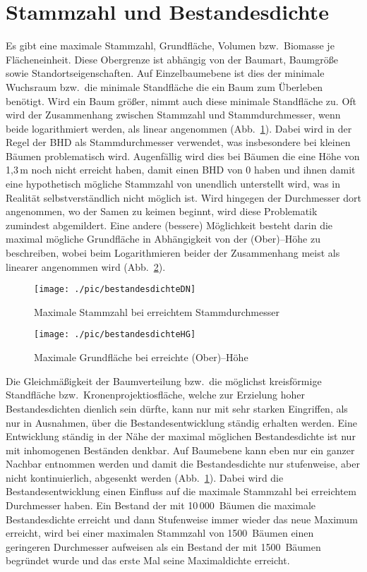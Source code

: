 \documentclass[twocolumn]{scrartcl}
\begin{document}
\section{Stammzahl und Bestandesdichte}
\label{sec:StammzahlUndBestandesdichte}

Es gibt eine maximale Stammzahl, Grundfläche, Volumen bzw.\ Biomasse je
Flächeneinheit. Diese Obergrenze ist abhängig von der Baumart, Baumgröße sowie
Standortseigenschaften. Auf Einzelbaumebene ist dies der minimale Wuchsraum
bzw.\ die minimale Standfläche die ein Baum zum Überleben benötigt. Wird ein
Baum größer, nimmt auch diese minimale Standfläche zu. Oft wird der Zusammenhang
zwischen Stammzahl und Stammdurchmesser, wenn beide logarithmiert werden, als
linear angenommen (Abb.~\ref{fig:bestandesdichteDN}). Dabei wird in der Regel
der BHD als Stammdurchmesser verwendet, was insbesondere bei kleinen Bäumen
problematisch wird. Augenfällig wird dies bei Bäumen die eine Höhe von 1,3\,m
noch nicht erreicht haben, damit einen BHD von 0 haben und ihnen damit eine
hypothetisch mögliche Stammzahl von unendlich unterstellt wird, was in Realität
selbstverständlich nicht möglich ist. Wird hingegen der Durchmesser dort
angenommen, wo der Samen zu keimen beginnt, wird diese Problematik zumindest
abgemildert. Eine andere (bessere) Möglichkeit besteht darin die maximal
mögliche Grundfläche in Abhängigkeit von der (Ober)--Höhe zu beschreiben, wobei
beim Logarithmieren beider der Zusammenhang meist als linearer angenommen wird
(Abb.~\ref{fig:bestandesdichteHG}).

\begin{figure}[htbp]
  \centering
  \texttt{[image: ./pic/bestandesdichteDN]}
  \caption{Maximale Stammzahl bei erreichtem Stammdurchmesser}
  \label{fig:bestandesdichteDN}
\end{figure}

\begin{figure}[htbp]
  \centering
  \texttt{[image: ./pic/bestandesdichteHG]}
  \caption{Maximale Grundfläche bei erreichte (Ober)--Höhe}
  \label{fig:bestandesdichteHG}
\end{figure}

Die Gleichmäßigkeit der Baumverteilung bzw.\ die möglichst kreisförmige
Standfläche bzw.\ Kronenprojektiosfläche, welche zur Erzielung hoher
Bestandesdichten dienlich sein dürfte, kann nur mit sehr starken Eingriffen, als
nur in Ausnahmen, über die Bestandesentwicklung ständig erhalten werden. Eine
Entwicklung ständig in der Nähe der maximal möglichen Bestandesdichte ist nur
mit inhomogenen Beständen denkbar. Auf Baumebene kann eben nur ein ganzer
Nachbar entnommen werden und damit die Bestandesdichte nur stufenweise, aber
nicht kontinuierlich, abgesenkt werden (Abb.~\ref{fig:bestandesdichteDN}). Dabei
wird die Bestandesentwicklung einen Einfluss auf die maximale Stammzahl bei
erreichtem Durchmesser haben. Ein Bestand der mit 10\,000~Bäumen die maximale
Bestandesdichte erreicht und dann Stufenweise immer wieder das neue Maximum
erreicht, wird bei einer maximalen Stammzahl von 1500~Bäumen einen geringeren
Durchmesser aufweisen als ein Bestand der mit 1500~Bäumen begründet wurde und
das erste Mal seine Maximaldichte erreicht.
\end{document}
